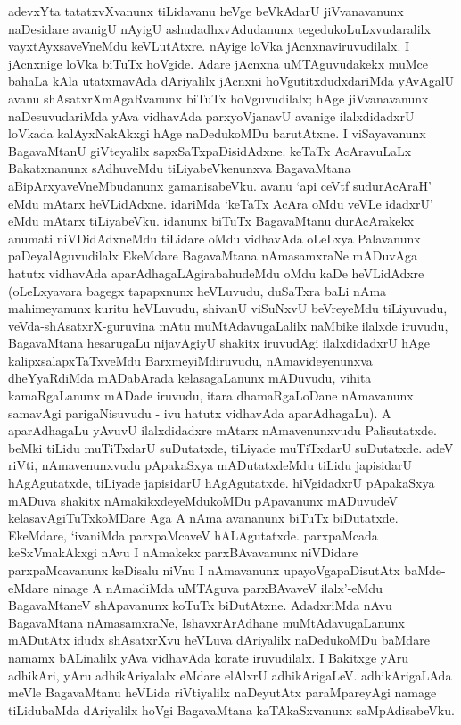 adevxYta tatatxvXvanunx tiLidavanu heVge beVkAdarU jiVvanavanunx naDesidare avanigU nAyigU ashudadhxvAdudanunx tegedukoLuLxvudaralilx vayxtAyxsaveVneMdu keVLutAtxre. nAyige loVka jAcnxnaviruvudilalx. I jAcnxnige loVka biTuTx hoVgide. Adare jAcnxna uMTAguvudakekx muMce bahaLa kAla utatxmavAda dAriyalilx jAcnxni hoVgutitxdudxdariMda yAvAgalU avanu shAsatxrXmAgaRvanunx biTuTx hoVguvudilalx; hAge jiVvanavanunx naDesuvudariMda yAva vidhavAda parxyoVjanavU avanige ilalxdidadxrU loVkada kalAyxNakAkxgi hAge naDedukoMDu barutAtxne. I viSayavanunx BagavaMtanU giVteyalilx sapxSaTxpaDisidAdxne. keTaTx AcAravuLaLx Bakatxnanunx sAdhuveMdu tiLiyabeVkenunxva BagavaMtana aBipArxyaveVneMbudanunx gamanisabeVku. avanu `api ceVtf sudurAcAraH' eMdu mAtarx heVLidAdxne. idariMda `keTaTx AcAra oMdu veVLe idadxrU' eMdu mAtarx tiLiyabeVku. idanunx biTuTx BagavaMtanu durAcArakekx anumati niVDidAdxneMdu tiLidare oMdu vidhavAda oLeLxya Palavanunx paDeyalAguvudilalx EkeMdare BagavaMtana nAmasamxraNe mADuvAga hatutx vidhavAda aparAdhagaLAgirabahudeMdu oMdu kaDe heVLidAdxre (oLeLxyavara bagegx tapapxnunx heVLuvudu, duSaTxra baLi nAma mahimeyanunx kuritu heVLuvudu, shivanU viSuNxvU beVreyeMdu tiLiyuvudu, veVda-shAsatxrX-guruvina mAtu muMtAdavugaLalilx naMbike ilalxde iruvudu, BagavaMtana hesarugaLu nijavAgiyU shakitx iruvudAgi ilalxdidadxrU hAge kalipxsalapxTaTxveMdu BarxmeyiMdiruvudu, nAmavideyenunxva dheYyaRdiMda mADabArada kelasagaLanunx mADuvudu, vihita kamaRgaLanunx mADade iruvudu, itara dhamaRgaLoDane nAmavanunx samavAgi parigaNisuvudu - ivu hatutx vidhavAda aparAdhagaLu). A aparAdhagaLu yAvuvU ilalxdidadxre mAtarx nAmavenunxvudu Palisutatxde. beMki tiLidu muTiTxdarU suDutatxde, tiLiyade muTiTxdarU suDutatxde. adeV riVti, nAmavenunxvudu pApakaSxya mADutatxdeMdu tiLidu japisidarU hAgAgutatxde, tiLiyade japisidarU hAgAgutatxde. hiVgidadxrU pApakaSxya mADuva shakitx nAmakikxdeyeMdukoMDu pApavanunx mADuvudeV kelasavAgiTuTxkoMDare Aga A nAma avananunx biTuTx biDutatxde. EkeMdare, `ivaniMda parxpaMcaveV hALAgutatxde. parxpaMcada keSxVmakAkxgi nAvu I nAmakekx parxBAvavanunx niVDidare parxpaMcavanunx keDisalu niVnu I nAmavanunx upayoVgapaDisutAtx baMde-eMdare ninage A nAmadiMda uMTAguva parxBAvaveV ilalx'-eMdu BagavaMtaneV shApavanunx koTuTx biDutAtxne. AdadxriMda nAvu BagavaMtana nAmasamxraNe, IshavxrArAdhane muMtAdavugaLanunx mADutAtx idudx shAsatxrXvu heVLuva dAriyalilx naDedukoMDu baMdare namamx bALinalilx yAva vidhavAda korate iruvudilalx. I Bakitxge yAru adhikAri, yAru adhikAriyalalx eMdare elAlxrU adhikArigaLeV. adhikArigaLAda meVle BagavaMtanu heVLida riVtiyalilx naDeyutAtx paraMpareyAgi namage tiLidubaMda dAriyalilx hoVgi BagavaMtana kaTAkaSxvanunx saMpAdisabeVku.



